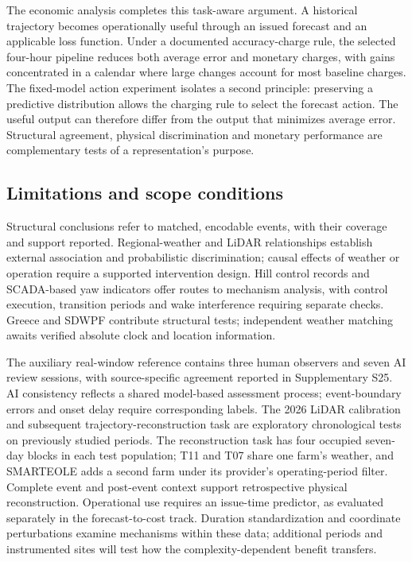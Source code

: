 \documentclass[preprint,12pt]{elsarticle}
\begin{document}
The economic analysis completes this task-aware argument. A historical trajectory becomes operationally useful through an issued forecast and an applicable loss function. Under a documented accuracy-charge rule, the selected four-hour pipeline reduces both average error and monetary charges, with gains concentrated in a calendar where large changes account for most baseline charges. The fixed-model action experiment isolates a second principle: preserving a predictive distribution allows the charging rule to select the forecast action. The useful output can therefore differ from the output that minimizes average error. Structural agreement, physical discrimination and monetary performance are complementary tests of a representation's purpose.

\subsection{Limitations and scope conditions}\label{limitations-and-scope-conditions}

Structural conclusions refer to matched, encodable events, with their coverage and support reported. Regional-weather and LiDAR relationships establish external association and probabilistic discrimination; causal effects of weather or operation require a supported intervention design. Hill control records and SCADA-based yaw indicators offer routes to mechanism analysis, with control execution, transition periods and wake interference requiring separate checks. Greece and SDWPF contribute structural tests; independent weather matching awaits verified absolute clock and location information.

The auxiliary real-window reference contains three human observers and seven AI review sessions, with source-specific agreement reported in Supplementary S25. AI consistency reflects a shared model-based assessment process; event-boundary errors and onset delay require corresponding labels. The 2026 LiDAR calibration and subsequent trajectory-reconstruction task are exploratory chronological tests on previously studied periods. The reconstruction task has four occupied seven-day blocks in each test population; T11 and T07 share one farm's weather, and SMARTEOLE adds a second farm under its provider's operating-period filter. Complete event and post-event context support retrospective physical reconstruction. Operational use requires an issue-time predictor, as evaluated separately in the forecast-to-cost track. Duration standardization and coordinate perturbations examine mechanisms within these data; additional periods and instrumented sites will test how the complexity-dependent benefit transfers.
\end{document}
